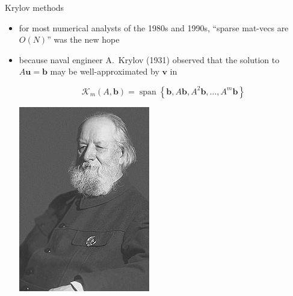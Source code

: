 \documentclass[hide notes,intlimits,usenames,dvipsnames]{beamer}
\newcommand{\bb}{\mathbf{b}}
\newcommand{\bu}{\mathbf{u}}
\newcommand{\bv}{\mathbf{v}}
\begin{document}
\begin{frame}{Krylov methods}
\begin{itemize}
\item for most numerical analysts of the 1980s and 1990s, ``sparse mat-vecs are $O(N)$'' was the new hope
\item \begin{minipage}[t]{0.7\textwidth}
because naval engineer A.~Krylov (1931) observed that the solution to $A\bu=\bb$ may be well-approximated by $\bv$ in

\vspace{-4mm}
$$\mathcal{K}_m(A,\bb) = \operatorname{span}\left\{\bb,A\bb,A^2\bb,\dots,A^m\bb\right\}$$
\end{minipage} \quad
\begin{minipage}[t]{0.18\textwidth}
\vspace{-3mm}

\includegraphics[width=\textwidth]{figs/krylov}
\end{minipage}


\end{itemize}
\end{frame}
\end{document}
